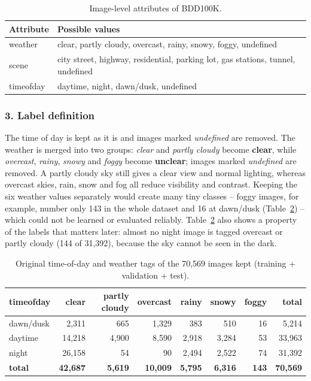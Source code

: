 \documentclass[12pt,letterpaper]{article}
\begin{document}
\begin{table}[htbp]
\centering\small
\caption{Image-level attributes of BDD100K.}
\label{tab:attrs}
\begin{tabular}{ll}
\toprule
Attribute & Possible values \\
\midrule
weather   & clear, partly cloudy, overcast, rainy, snowy, foggy, undefined \\
scene     & city street, highway, residential, parking lot, gas stations, tunnel, undefined \\
timeofday & daytime, night, dawn/dusk, undefined \\
\bottomrule
\end{tabular}
\end{table}

\subsubsection{3. Label definition}
The time of day is kept as it is and images marked \emph{undefined} are removed. The weather is merged into two groups:
\emph{clear} and \emph{partly cloudy} become \textbf{clear}, while \emph{overcast}, \emph{rainy}, \emph{snowy} and
\emph{foggy} become \textbf{unclear}; images marked \emph{undefined} are removed. A partly cloudy sky still gives a
clear view and normal lighting, whereas overcast skies, rain, snow and fog all reduce visibility and contrast.
Keeping the six weather values separately would create many tiny classes -- foggy images, for example, number only
143 in the whole dataset and 16 at dawn/dusk (Table~\ref{tab:attrcounts}) -- which could not be learned or evaluated
reliably. Table~\ref{tab:attrcounts} also shows a property of the labels that matters later: almost no night image is
tagged overcast or partly cloudy (144 of 31{,}392), because the sky cannot be seen in the dark.

\begin{table}[htbp]
\centering\small
\caption{Original time-of-day and weather tags of the 70{,}569 images kept (training + validation + test).}
\label{tab:attrcounts}
\begin{tabular}{lrrrrrrr}
\toprule
timeofday & clear & partly cloudy & overcast & rainy & snowy & foggy & total \\
\midrule
dawn/dusk & 2{,}311  & 665     & 1{,}329  & 383     & 510     & 16  & 5{,}214 \\
daytime   & 14{,}218 & 4{,}900 & 8{,}590  & 2{,}918 & 3{,}284 & 53  & 33{,}963 \\
night     & 26{,}158 & 54      & 90       & 2{,}494 & 2{,}522 & 74  & 31{,}392 \\
\midrule
\textbf{total} & \textbf{42{,}687} & \textbf{5{,}619} & \textbf{10{,}009} & \textbf{5{,}795} & \textbf{6{,}316}
  & \textbf{143} & \textbf{70{,}569} \\
\bottomrule
\end{tabular}
\end{table}
\end{document}
